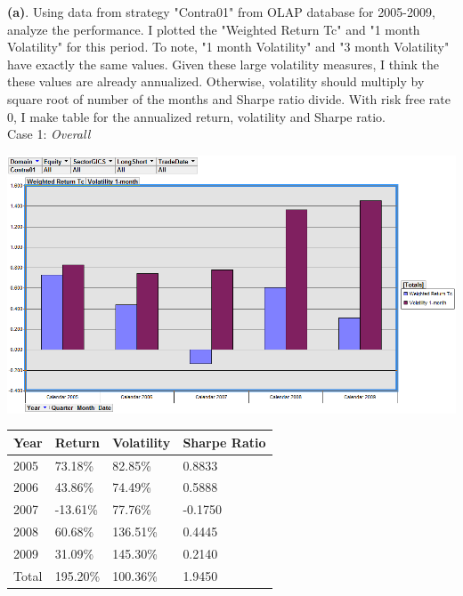 \documentclass[11pt,letter]{article}
\begin{document}
\textbf{(a)}. Using data from strategy "Contra01" from OLAP database for 2005-2009, analyze the performance. I plotted the "Weighted Return Tc" and "1 month Volatility" for this period. To note, "1 month Volatility" and "3 month Volatility" have exactly the same values. Given these large volatility measures, I think the these values are already annualized. Otherwise, volatility should multiply by square root of number of the months and Sharpe ratio divide. With risk free rate 0, I make table for the annualized return, volatility and Sharpe ratio.\\

Case 1: \textit{Overall}
\begin{center}
\includegraphics[scale=0.5,keepaspectratio]{2a_overall}
\newline

\begin{tabular}{l | l l l}
Year & Return & Volatility & Sharpe Ratio\\
\hline
2005	 & 73.18\% & 82.85\% & 0.8833\\
2006	 & 43.86\% & 74.49\% & 0.5888\\
2007	&-13.61\%	&77.76\%	&-0.1750\\
2008	&60.68\%	&136.51\%	&0.4445\\
2009	&31.09\%	&145.30\%	&0.2140\\
\hline
Total&	195.20\%	&100.36\%	&1.9450
\end{tabular}
\end{center}
\end{document}
